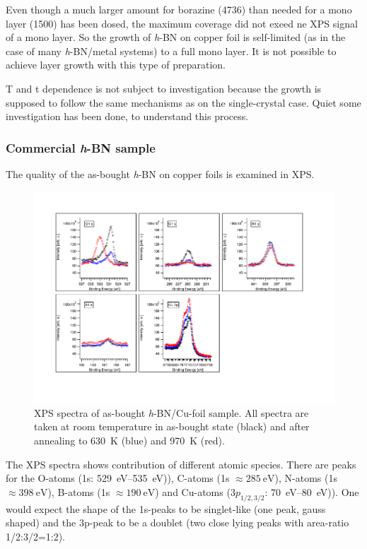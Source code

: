 Even though a much larger amount for borazine (\SI{4736}{\langmuir}) than needed for a mono layer (\SI{1500}{\langmuir}) has been dosed, the maximum coverage did not exeed ne XPS signal of a mono layer. So the growth of \textit{h}-BN on copper foil is self-limited (as in the case of many \textit{h}-BN/metal systems) to a full mono layer. It is not possible to achieve layer growth with this type of preparation.

T and t dependence is not subject to investigation because the growth is supposed to follow the same mechanisms as on the single-crystal case. Quiet some investigation has been done, \cite{orlando_epitaxial_2012,preobrajenski_monolayer_2007-1} to understand this process.

\subsubsection{Commercial \textit{h}-BN sample}
The quality of the as-bought \textit{h}-BN on copper foils\cite{_graphene_2014} is examined in XPS.
\begin{landscape}
	\begin{figure}
		\includegraphics[angle=0,width=1.2\textwidth]{./images/XPS-spectra-as-bought.pdf}
		\caption{XPS spectra of as-bought \textit{h}-BN/Cu-foil sample\cite{_graphene_2014}. All spectra are taken at room temperature in as-bought state (black) and after annealing to  \SI{630}{\K} (blue) and  \SI{970}{\K} (red).}
	\end{figure}
\end{landscape}	
The XPS spectra shows contribution of different atomic species. There are peaks for the O-atoms (1s: \SIrange{529}{535}{\eV})), C-atoms (1s $\approx \SI{285}{\eV}$), N-atoms (1s $\approx \SI{398}{\eV}$), B-atoms (1s $\approx \SI{190}{\eV}$) and Cu-atoms ($3p_{1/2,3/2}$: \SIrange{70}{80}{\eV})). One would expect the shape of the 1s-peaks to be singlet-like (one peak, gauss shaped) and the 3p-peak to be a doublet (two close lying peaks with area-ratio 1/2:3/2=1:2).

